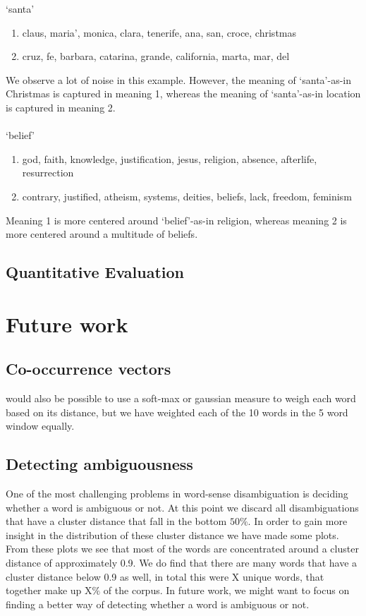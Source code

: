 \documentclass[11pt]{article}
\begin{document}
`santa'
\begin{enumerate}
\item claus, maria', monica, clara, tenerife, ana, san, croce, christmas
\item cruz, fe, barbara, catarina, grande, california, marta, mar, del
\end{enumerate}
We observe a lot of noise in this example. However, the meaning of `santa'-as-in Christmas is captured in meaning 1, whereas the meaning of `santa'-as-in location is captured in meaning 2. \\\\
`belief'
\begin{enumerate}
\item god, faith, knowledge, justification, jesus, religion, absence, afterlife, resurrection
\item contrary, justified, atheism, systems, deities, beliefs, lack, freedom, feminism
\end{enumerate}
Meaning 1 is more centered around `belief'-as-in religion, whereas meaning 2 is more centered around a multitude of beliefs. 

\subsection{Quantitative Evaluation}
\section{Future work}
\subsection{Co-occurrence vectors}
would also be possible to use a soft-max or gaussian measure to weigh each word based on its distance, but we have weighted each of the 10 words in the 5 word window equally.
\subsection{Detecting ambiguousness}
One of the most challenging problems in word-sense disambiguation is deciding whether a word is ambiguous or not. At this point we discard all disambiguations that have a cluster distance that fall in the bottom $50\%$. In order to gain more insight in the distribution of these cluster distance we have made some plots. From these plots we see that most of the words are concentrated around a cluster distance of approximately 0.9. We do find that there are many words that have a cluster distance below 0.9 as well, in total this were X unique words, that together make up X$\%$ of the corpus. In future work, we might want to focus on finding a better way of detecting whether a word is ambiguous or not. 
\end{document}
